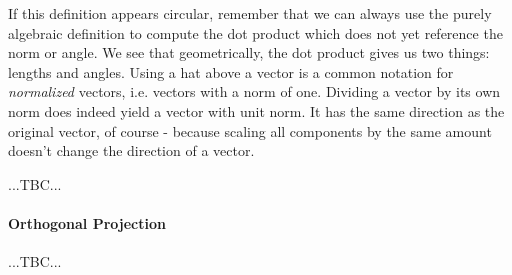If this definition appears circular, remember that we can always use the purely algebraic definition to compute the dot product which does not yet reference the norm or angle. We see that geometrically, the dot product gives us two things: lengths and angles. Using a hat above a vector is a common notation for \emph{normalized} vectors, i.e. vectors with a norm of one. Dividing a vector by its own norm does indeed yield a vector with unit norm. It has the same direction as the original vector, of course - because scaling all components by the same amount doesn't change the direction of a vector.

 ...TBC...




\paragraph{Orthogonal Projection} ...TBC...

